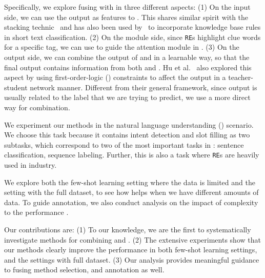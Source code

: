 


Specifically, we explore fusing \RE with \NN in three different aspects:
(1) On the \NN input side, we can use the \RE output as features to \NN. 
This shares similar spirit with the stacking technic~\cite{wolpert1992stacked} and has also been used by~\cite{wangcombining17} to incorporate knowledge base rules in short text classification. 
(2) On the \NN module side, since \texttt{RE}s highlight clue words for a specific tag, we can use \RE to guide the attention module in \NN.
(3) On the \NN output side, we can combine the output of \RE and \NN in a learnable way, so that the final output contains information from both \NN and \RE. 
Hu et al.~ also explored this aspect by using first-order-logic (\FOL) constraints to affect the \NN output in a teacher-student network manner.
Different from their general framework, since \RE output is usually related to the label that we are trying to predict, we use a more direct way for combination. 

We experiment our methods in the natural language understanding (\NLU) scenario.
We choose this task because it contains intent detection and slot filling as two subtasks, which correspond to two of the most important tasks in \NLP: sentence classification, sequence labeling. Further, this is also a task where \texttt{RE}s are heavily used in industry.

We explore both the few-shot learning setting where the data is limited and the setting with the full dataset, to see how \RE helps when we have different amounts of data. 
To guide \RE annotation, we also conduct analysis on the impact of \RE complexity to the performance \NN. 

Our contributions are: (1) To our knowledge, we are the first to systematically investigate methods for combining \RE and \NN. (2) The extensive experiments show that our methods clearly improve the \NN performance in both few-shot learning settings, and the settings with full dataset. (3) Our analysis provides meaningful guidance to fusing method selection, and \RE annotation as well.

